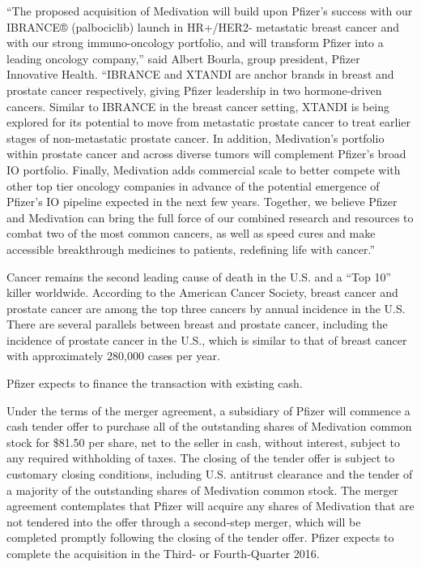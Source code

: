 \documentclass[letterpaper,12pt,english]{sphinxmanual}
\begin{document}
“The proposed acquisition of Medivation will build upon Pfizer’s success with our IBRANCE® (palbociclib) launch in HR+/HER2- metastatic breast cancer and with our strong immuno-oncology portfolio, and will transform Pfizer into a leading oncology company,” said Albert Bourla, group president, Pfizer Innovative Health. “IBRANCE and XTANDI are anchor brands in breast and prostate cancer respectively, giving Pfizer leadership in two hormone-driven cancers. Similar to IBRANCE in the breast cancer setting, XTANDI is being explored for its potential to move from metastatic prostate cancer to treat earlier stages of non-metastatic prostate cancer. In addition, Medivation’s portfolio within prostate cancer and across diverse tumors will complement Pfizer’s broad IO portfolio. Finally, Medivation adds commercial scale to better compete with other top tier oncology companies in advance of the potential emergence of Pfizer’s IO pipeline expected in the next few years. Together, we believe Pfizer and Medivation can bring the full force of our combined research and resources to combat two of the most common cancers, as well as speed cures and make accessible breakthrough medicines to patients, redefining life with cancer.”

Cancer remains the second leading cause of death in the U.S. and a “Top 10” killer worldwide. According to the American Cancer Society, breast cancer and prostate cancer are among the top three cancers by annual incidence in the U.S. There are several parallels between breast and prostate cancer, including the incidence of prostate cancer in the U.S., which is similar to that of breast cancer with approximately 280,000 cases per year.

Pfizer expects to finance the transaction with existing cash.

Under the terms of the merger agreement, a subsidiary of Pfizer will commence a cash tender offer to purchase all of the outstanding shares of Medivation common stock for \$81.50 per share, net to the seller in cash, without interest, subject to any required withholding of taxes. The closing of the tender offer is subject to customary closing conditions, including U.S. antitrust clearance and the tender of a majority of the outstanding shares of Medivation common stock. The merger agreement contemplates that Pfizer will acquire any shares of Medivation that are not tendered into the offer through a second-step merger, which will be completed promptly following the closing of the tender offer. Pfizer expects to complete the acquisition in the Third- or Fourth-Quarter 2016.
\end{document}
